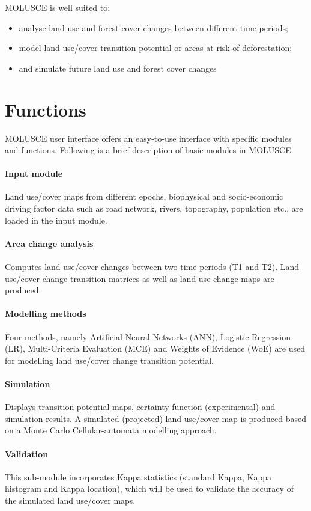 \documentclass{report}
\begin{document}
MOLUSCE is well suited to:
\begin{itemize}
  \item analyse land use and forest cover changes between different time periods;
  \item model land use/cover transition potential or areas at risk of deforestation; 
  \item and simulate future land use and forest cover changes
\end{itemize}


\section{Functions}
MOLUSCE user interface offers an easy-to-use interface with specific modules and functions.
Following is a brief description of basic modules in MOLUSCE.

\paragraph{Input module}
Land use/cover maps from different epochs, biophysical and socio-economic driving factor data
such as road network, rivers, topography, population etc., are loaded in the input module.

\paragraph{Area change analysis}
Computes land use/cover changes between two time periods (T1 and T2). Land use/cover change
transition matrices as well as land use change maps are produced.

\paragraph{Modelling methods}
Four methods, namely Artificial Neural Networks (ANN), Logistic Regression (LR), Multi-Criteria
Evaluation (MCE) and Weights of Evidence (WoE) are used for modelling land use/cover change
transition potential.

\paragraph{Simulation}
Displays transition potential maps, certainty function (experimental) and simulation results. A
simulated (projected) land use/cover map is produced based on a Monte Carlo Cellular-automata
modelling approach.

\paragraph{Validation}
This sub-module incorporates Kappa statistics (standard Kappa, Kappa histogram and Kappa
location), which will be used to validate the accuracy of the simulated land use/cover maps.
\end{document}
